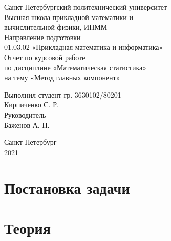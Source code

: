 \documentclass[a4paper]{article}
\begin{document}
\large
\begin{center}
    Санкт-Петербургский политехнический университет\\
    Высшая школа прикладной математики и\\вычислительной физики, ИПММ\\
    \vspace{3em}
    Направление подготовки\\
    01.03.02 «Прикладная математика и информатика»\\
    \vspace{10em}
    \Large
    Отчет по курсовой работе \\
    по дисциплине «Математическая статистика»\\
    на тему «Метод главных компонент»
    \vspace{19em}
    \large
\end{center}
Выполнил студент гр. 3630102/80201\\
Кирпиченко С. Р.\\
Руководитель\\
Баженов А. Н.
\vspace{10em}
\begin{center}
    Санкт-Петербург\\
    2021
\end{center}
\thispagestyle{empty}
\newpage
\tableofcontents
{}
\newpage
\listoffigures
{}
\newpage
\listoftables
{}
\newpage
\section{Постановка задачи}

\section{Теория}
\end{document}
